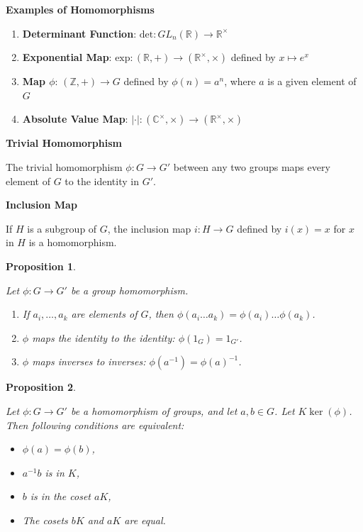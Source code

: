 \documentclass[
]{book}
\providecommand{\tightlist}{%
  \setlength{\itemsep}{0pt}\setlength{\parskip}{0pt}}
\newtheorem{proposition}{Proposition}[chapter]
\theoremstyle{definition}
\theoremstyle{definition}
\theoremstyle{definition}
\theoremstyle{definition}
\theoremstyle{remark}
\begin{document}
\textbf{Examples of Homomorphisms}

\begin{enumerate}
\def\labelenumi{\arabic{enumi}.}
\tightlist
\item
  \textbf{Determinant Function}: \(\text{det}: GL_n(\mathbb{R}) \to \mathbb{R}^\times\)
\item
  \textbf{Exponential Map}: \(\text{exp}: (\mathbb{R}, +) \to (\mathbb{R}^\times, \times)\) defined by \(x \mapsto e^x\)
\item
  \textbf{Map \(\phi\)}: \((\mathbb{Z}, +) \to G\) defined by \(\phi(n) = a^n\), where \(a\) is a given element of \(G\)
\item
  \textbf{Absolute Value Map}: \(|\cdot| : (\mathbb{C}^\times, \times) \to (\mathbb{R}^\times, \times)\)
\end{enumerate}

\textbf{Trivial Homomorphism}

The trivial homomorphism \(\phi: G \rightarrow G'\) between any two groups maps every element of \(G\) to the identity in \(G'\).

\textbf{Inclusion Map}

If \(H\) is a subgroup of \(G\), the inclusion map \(i: H \rightarrow G\) defined by \(i(x) = x\) for \(x\) in \(H\) is a homomorphism.

\begin{proposition}
\protect\hypertarget{prp:unnamed-chunk-18}{}\label{prp:unnamed-chunk-18}

Let \(\phi: G \rightarrow G'\) be a group homomorphism.

\begin{enumerate}
\def\labelenumi{(\alph{enumi})}
\item
  If \(a_i, \ldots, a_k\) are elements of \(G\), then \(\phi(a_i \ldots a_k) = \phi(a_i) \ldots \phi(a_k)\).
\item
  \(\phi\) maps the identity to the identity: \(\phi(1_G) = 1_{G'}\).
\item
  \(\phi\) maps inverses to inverses: \(\phi(a^{-1}) = \phi(a)^{-1}\).
\end{enumerate}

\end{proposition}

\begin{proposition}
\protect\hypertarget{prp:258}{}\label{prp:258}

Let \(\phi : G \rightarrow G'\) be a homomorphism of groups, and
let \(a,b\in G\). Let \(K\ker(\phi)\).
Then following conditions are equivalent:

\begin{itemize}
\tightlist
\item
  \(\phi(a) = \phi(b)\),\\
\item
  \(a^{-1}b\) is in \(K\),
\item
  \(b\) is in the coset \(aK\),
\item
  The cosets \(bK\) and \(aK\) are equal.
\end{itemize}

\end{proposition}
\end{document}
